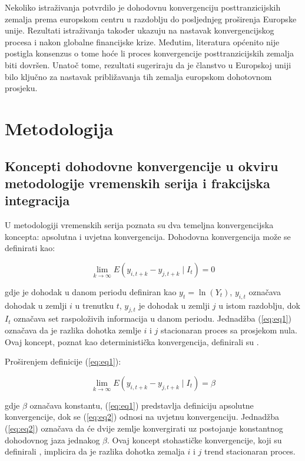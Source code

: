 \documentclass{crebsshr}
\begin{document}
Nekoliko istra\v{z}ivanja potvrdilo je dohodovnu konvergenciju posttranzicijskih zemalja prema europskom centru \citep{monfort:13, rapacki-prochniak:19, szeles-marinescu:10} u razdoblju do posljednjeg pro\v{s}irenja Europske unije. Rezultati istraživanja također ukazuju na nastavak konvergencijskog procesa i nakon globalne financijske krize. Međutim, literatura općenito nije postigla konsenzus o tome hoće li proces konvergencije posttranzicijskih zemalja biti dovršen. Unatoč tome, rezultati sugeriraju da je članstvo u Europskoj uniji bilo ključno za nastavak približavanja tih zemalja europskom dohotovnom prosjeku.

\section{Metodologija}

\subsection{Koncepti dohodovne konvergencije u okviru metodologije vremenskih serija i frakcijska integracija}

U metodologiji vremenskih serija poznata su dva temeljna konvergencijska koncepta: apsolutna i uvjetna konvergencija. Dohodovna konvergencija može se definirati kao:

\begin{equation} \label{eq:eq1}
\lim_{k \to \infty} E(y_{i,t+k} - y_{j,t+k} \mid I_t) = 0
\end{equation}

gdje je dohodak u danom periodu definiran kao \( y_t = \ln(Y_t) \), \( y_{i,t} \) označava dohodak u zemlji \( i \) u trenutku \( t \), \( y_{j,t} \) je dohodak u zemlji \( j \) u istom razdoblju, dok \( I_t \) označava set raspoloživih informacija u danom periodu. Jednadžba (\ref{eq:eq1}) označava da je razlika dohotka zemlje \( i \) i \( j \) stacionaran proces sa prosjekom nula. Ovaj koncept, poznat kao deterministička konvergencija, definirali su  \cite{bernard-durlauf:91}.

Proširenjem definicije (\ref{eq:eq1}):

\begin{equation} \label{eq:eq2}
\lim_{k \to \infty} E(y_{i,t+k} - y_{j,t+k} \mid I_t) = \beta
\end{equation}

gdje \( \beta \) označava konstantu, (\ref{eq:eq1}) predstavlja definiciju apsolutne konvergencije, dok se (\ref{eq:eq2}) odnosi na uvjetnu konvergenciju. Jednadžba (\ref{eq:eq2}) označava da će dvije zemlje konvergirati uz postojanje konstantnog dohodovnog jaza jednakog \( \beta \). Ovaj koncept stohastičke konvergencije, koji su definirali  \cite{carlino-mills:93}, implicira da je razlika dohotka zemalja \( i \) i \( j \) trend stacionaran proces.
\end{document}

